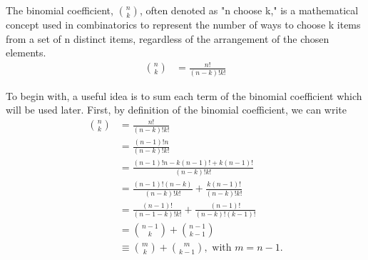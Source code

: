 \begin{defn}{1}
	The binomial coefficient, ${{n}\choose{k}}$, often denoted as "n choose k," is a mathematical concept used in combinatorics to represent the number of ways to choose k items from a set of n distinct items, regardless of the arrangement of the chosen elements. 	
	\begin{align}
		{{n}\choose{k}}&=\frac{n!}{(n-k)!k!}
	\end{align}
\end{defn}

To begin with, a useful idea is to sum each term of the binomial coefficient which will be used later. First, by definition of the binomial coefficient, we can write
\begin{align}
	{{n}\choose{k}}&=\frac{n!}{(n-k)!k!} \label{binomial-coefficient-defn}\\
	&=\frac{(n-1)!n}{(n-k)!k!}\\&
	=\frac{(n-1)!n-k(n-1)!+k(n-1)!}{(n-k)!k!}\\
	&=\frac{(n-1)!(n-k)}{(n-k)!k!}+\frac{k(n-1)!}{(n-k)!k!}\\
	&=\frac{(n-1)!}{(n-1-k)!k!}+\frac{(n-1)!}{(n-k)!(k-1)!}\\&={{n-1}\choose{k}}+{{n-1}\choose{k-1}} \label{n-1choosek+n-1choosek-1}\\
	&\equiv {{m}\choose{k}}+{{m}\choose{k-1}}, \textrm{ with }m=n-1.
\end{align} 

